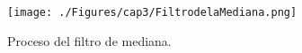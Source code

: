     \begin{figure}[H]
    	\centering
    	\texttt{[image: ./Figures/cap3/FiltrodelaMediana.png]}
    	\caption{Proceso del filtro de mediana.}
    	\label{fig:filMediata}
    \end{figure}






